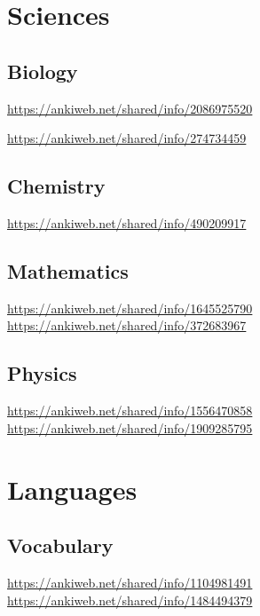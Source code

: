 \documentclass{article}
\begin{document}
\newline
\tableofcontents
\section{Sciences}
\subsection{Biology}

	
	\newline
	\url{https://ankiweb.net/shared/info/2086975520}
	
		\newline
	\url{https://ankiweb.net/shared/info/274734459}
	\newline

	\subsection{Chemistry}

	
	\newline
	\url{https://ankiweb.net/shared/info/490209917}
	\newline
\subsection{Mathematics}

	
	\newline
	\url{https://ankiweb.net/shared/info/1645525790}
	\newline
	\url{https://ankiweb.net/shared/info/372683967}
	\newline
	\subsection{Physics}

	
	\newline
	\url{https://ankiweb.net/shared/info/1556470858}
	\newline
		\url{https://ankiweb.net/shared/info/1909285795}
\section{Languages}
\subsection{Vocabulary}

	\url{https://ankiweb.net/shared/info/1104981491}
	\newline
	\url{https://ankiweb.net/shared/info/1484494379}
	\newline
\end{document}
